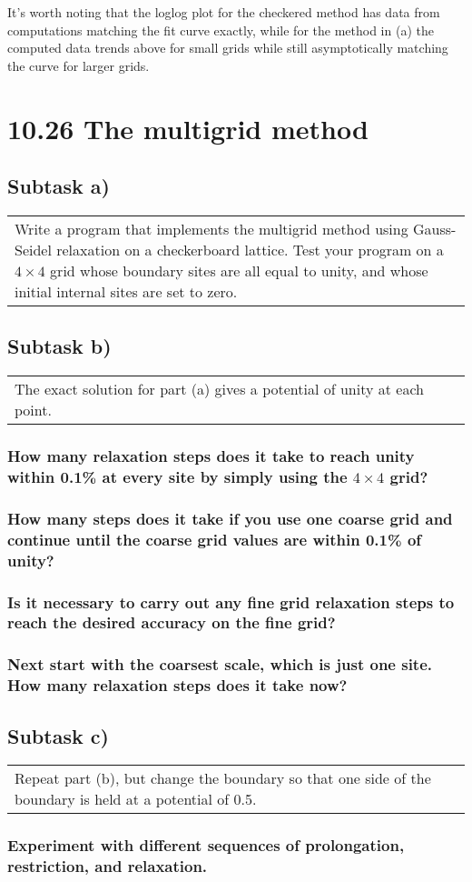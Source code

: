 \documentclass[11pt]{article}
\newcommand{\task}[2]{
  \subsection*{Subtask #1)}
  \begin{tabular}{|p{0.9\textwidth}}
    #2\\
  \end{tabular}
}
\newcommand{\subtask}[1]{
  \subsubsection*{#1}
}
\begin{document}
It's worth noting that the loglog plot for the checkered method has data from computations matching the fit curve exactly,
while for the method in (a) the computed data trends above for small grids while still asymptotically matching the curve for larger grids.

\section*{10.26 The multigrid method}
\task{a}{
  Write a program that implements the multigrid method using Gauss-Seidel relaxation on a checkerboard lattice. 
  Test your program on a $4×4$ grid whose boundary sites are all equal to unity, and whose initial internal sites are set to zero.
}
\task{b}{
  The exact solution for part (a) gives a potential of unity at each point.
}
\subtask{How many relaxation steps does it take to reach unity within 0.1\% at every site by simply using the $4×4$ grid?}
\subtask{How many steps does it take if you use one coarse grid and continue until the coarse grid values are within 0.1\% of unity?}
\subtask{Is it necessary to carry out any fine grid relaxation steps to reach the desired accuracy on the fine grid?}
\subtask{Next start with the coarsest scale, which is just one site. How many relaxation steps does it take now?}

\task{c}{
  Repeat part (b), but change the boundary so that one side of the boundary is held at a potential of 0.5.
}
\subtask{Experiment with different sequences of prolongation, restriction, and relaxation.}
\end{document}
